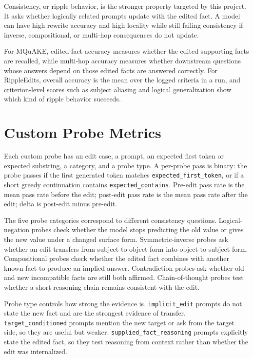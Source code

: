 \documentclass[11pt]{article}
\begin{document}
Consistency, or ripple behavior, is the stronger property targeted by this project. It asks whether logically related prompts update with the edited fact. A model can have high rewrite accuracy and high locality while still failing consistency if inverse, compositional, or multi-hop consequences do not update.

For MQuAKE, edited-fact accuracy measures whether the edited supporting facts are recalled, while multi-hop accuracy measures whether downstream questions whose answers depend on those edited facts are answered correctly. For RippleEdits, overall accuracy is the mean over the logged criteria in a run, and criterion-level scores such as subject aliasing and logical generalization show which kind of ripple behavior succeeds.

\section{Custom Probe Metrics}

Each custom probe has an edit case, a prompt, an expected first token or expected substring, a category, and a probe type. A per-probe pass is binary: the probe passes if the first generated token matches \texttt{expected\_first\_token}, or if a short greedy continuation contains \texttt{expected\_contains}. Pre-edit pass rate is the mean pass rate before the edit; post-edit pass rate is the mean pass rate after the edit; delta is post-edit minus pre-edit.

The five probe categories correspond to different consistency questions. Logical-negation probes check whether the model stops predicting the old value or gives the new value under a changed surface form. Symmetric-inverse probes ask whether an edit transfers from subject-to-object form into object-to-subject form. Compositional probes check whether the edited fact combines with another known fact to produce an implied answer. Contradiction probes ask whether old and new incompatible facts are still both affirmed. Chain-of-thought probes test whether a short reasoning chain remains consistent with the edit.

Probe type controls how strong the evidence is. \texttt{implicit\_edit} prompts do not state the new fact and are the strongest evidence of transfer. \texttt{target\_conditioned} prompts mention the new target or ask from the target side, so they are useful but weaker. \texttt{supplied\_fact\_reasoning} prompts explicitly state the edited fact, so they test reasoning from context rather than whether the edit was internalized.
\end{document}
